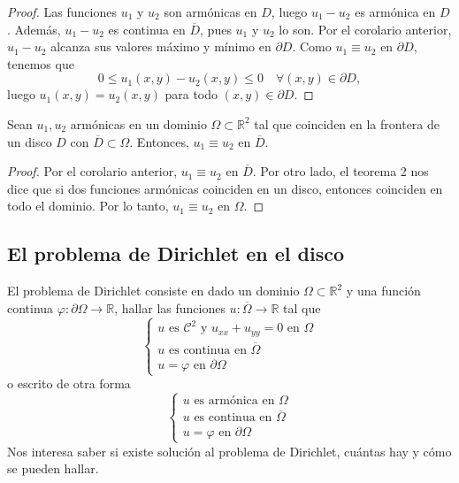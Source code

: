 \begin{proof}
    Las funciones $u_1$ y $u_2$ son armónicas en $D$, luego $u_1 - u_2$ es armónica en $D$. Además, $u_1 - u_2$ es continua en $\overline{D}$, pues $u_1$ y $u_2$ lo son. Por el corolario anterior, $u_1 - u_2$ alcanza sus valores máximo y mínimo en $\partial D$. Como $u_1 \equiv u_2$ en $\partial D$, tenemos que
    \[
        0 \leq u_1(x,y) - u_2(x,y) \leq 0 \quad \forall (x,y) \in \partial D,
    \]
    luego $u_1(x,y) = u_2(x,y)$ para todo $(x,y) \in \partial D$. 
\end{proof}

\begin{corolario}
    Sean $u_1,u_2$ armónicas en un dominio $\Omega \subset \mathbb{R}^2$ tal que coinciden en la frontera de un disco $D$ con $\overline{D} \subset \Omega$. Entonces, $u_1 \equiv u_2$ en $\overline{D}$.
\end{corolario}

\begin{proof}
    Por el corolario anterior, $u_1 \equiv u_2$ en $\overline{D}$. Por otro lado, el teorema 2 nos dice que si dos funciones armónicas coinciden en un disco, entonces coinciden en todo el dominio. Por lo tanto, $u_1 \equiv u_2$ en $\Omega$.
\end{proof}

\subsection{El problema de Dirichlet en el disco}

El problema de Dirichlet consiste en dado un dominio $\Omega \subset \mathbb{R}^2$ y una función continua $\varphi:\partial \Omega \to \mathbb{R}$, hallar las funciones $u:\overline{\Omega} \to \mathbb{R}$ tal que
\[
    \begin{cases}
        u \text{ es } \mathcal{C}^2 \text{ y } u_{xx} + u_{yy} = 0 \text{ en } \Omega \\
        u \text{ es continua en } \overline{\Omega} \\
        u = \varphi \text{ en } \partial \Omega
    \end{cases}
\]
o escrito de otra forma
\[
    \begin{cases}
        u \text{ es armónica en } \Omega \\
        u \text{ es continua en } \overline{\Omega} \\
        u = \varphi \text{ en } \partial \Omega
    \end{cases}
\]
Nos interesa saber si existe solución al problema de Dirichlet, cuántas hay y cómo se pueden hallar. 

